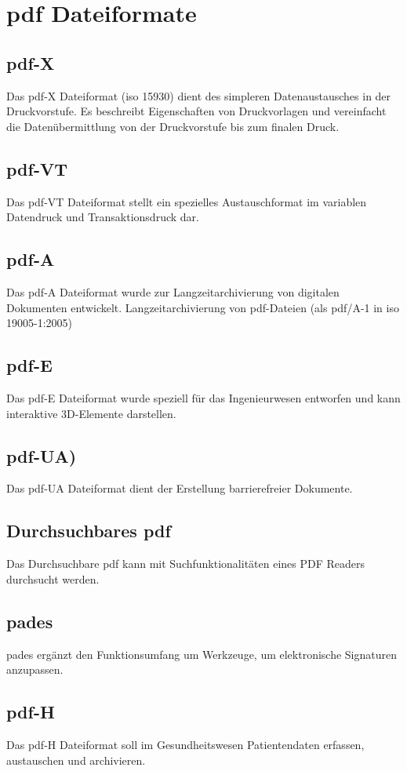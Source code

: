 \section{\gls{pdf} Dateiformate}

\subsection{\gls{pdf}-X}
Das \gls{pdf}-X Dateiformat (\gls{iso} 15930) dient des simpleren Datenaustausches in der Druckvorstufe. Es beschreibt Eigenschaften von Druckvorlagen und vereinfacht die Datenübermittlung von der Druckvorstufe bis zum finalen Druck.

\subsection{\gls{pdf}-VT}
Das \gls{pdf}-VT Dateiformat stellt ein spezielles Austauschformat im variablen Datendruck und Transaktionsdruck dar.

\subsection{\gls{pdf}-A}
Das \gls{pdf}-A Dateiformat wurde zur Langzeitarchivierung von digitalen Dokumenten entwickelt.
Langzeitarchivierung von \gls{pdf}-Dateien (als \gls{pdf}/A-1 in \gls{iso} 19005-1:2005) 

\subsection{\gls{pdf}-E}
Das \gls{pdf}-E Dateiformat wurde speziell für das Ingenieurwesen entworfen und kann interaktive 3D-Elemente darstellen.

\subsection{\gls{pdf}-UA)}
Das \gls{pdf}-UA Dateiformat dient der Erstellung barrierefreier Dokumente.

\subsection{Durchsuchbares \gls{pdf}}
Das Durchsuchbare \gls{pdf} kann mit Suchfunktionalitäten eines PDF Readers durchsucht werden.

\subsection{\gls{pades}}
\gls{pades} ergänzt den Funktionsumfang um Werkzeuge, um elektronische Signaturen anzupassen.

\subsection{\gls{pdf}-H}
Das \gls{pdf}-H Dateiformat soll im Gesundheitswesen Patientendaten erfassen, austauschen und archivieren.
